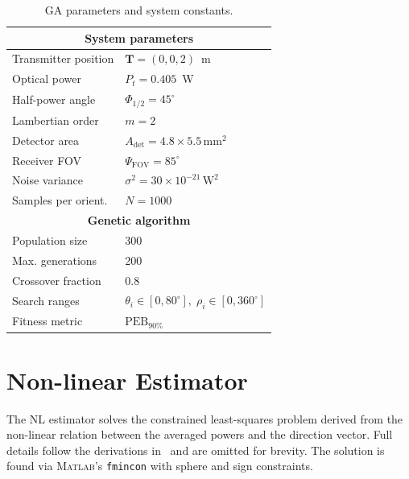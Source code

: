 \documentclass[lettersize,journal]{IEEEtran}
\begin{document}
\begin{table}[t]
  \centering
  \caption{GA parameters and system constants.}
  \label{tab:ga_params}
  \begin{tabular}{@{}ll@{}}
    \toprule
    \multicolumn{2}{c}{\textbf{System parameters}} \\
    \midrule
    Transmitter position & $\mathbf T = (0,0,2)$~m \\
    Optical power        & $P_t = 0.405$~W \\
    Half-power angle     & $\Phi_{1/2} = 45^{\circ}$ \\
    Lambertian order     & $m = 2$ \\
    Detector area        & $A_{\mathrm{det}} = 4.8\times5.5\,\mathrm{mm}^2$ \\
    Receiver FOV         & $\Psi_{\mathrm{FOV}} = 85^{\circ}$ \\
    Noise variance       & $\sigma^{2}=30\times10^{-21}\,\mathrm{W}^2$ \\
    Samples per orient.  & $N = 1000$ \\
    \midrule
    \multicolumn{2}{c}{\textbf{Genetic algorithm}} \\
    \midrule
    Population size      & 300 \\
    Max. generations     & 200 \\
    Crossover fraction   & 0.8 \\
    Search ranges        & $\theta_i\!\in[0,80^{\circ}],\; \rho_i\!\in[0,360^{\circ}]$ \\
    Fitness metric       & $\mathrm{PEB}_{90\%}$ \\
    \bottomrule
  \end{tabular}
\end{table}

\section{Non-linear Estimator}
\label{sec:NoLinear}
The NL estimator solves the constrained least-squares problem derived from the non-linear relation between the averaged powers and the direction vector.  Full details follow the derivations in~\cite{Li2014} and are omitted for brevity.  The solution is found via \textsc{Matlab}'s \texttt{fmincon} with sphere and sign constraints.

\end{document}
